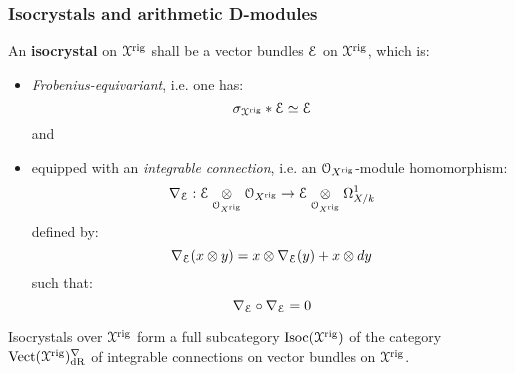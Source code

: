             \subsubsection{Isocrystals and arithmetic D-modules}
               \begin{definition}[Isocrystals] \label{def: isocrystals}
                    An \textbf{isocrystal} on $\mathcal{X}^{\mathrm{rig}}$ shall be a vector bundles $\mathcal{E}$ on $\mathcal{X}^{\mathrm{rig}}$, which is:
                        \begin{itemize}
                            \item \textit{Frobenius-equivariant}, i.e. one has:
                                $$\sigma_{\mathcal{X}^{\mathrm{rig}}}* \mathcal{E} \simeq \mathcal{E}$$
                            and
                            \item equipped with an \textit{integrable connection}, i.e. an $\mathcal{O}_{X^{\mathrm{rig}}}$-module homomorphism:
                                $$\nabla_{\E}: \E \tensor_{\calO_{X^{\rig}}} \calO_{X^{\rig}} \to \E \tensor_{\calO_{X^{\rig}}} \Omega^1_{X/k}$$
                            defined by:
                                $$\nabla_{\E}(x \tensor y) = x \tensor \nabla_{\E}(y) + x \tensor dy$$
                            such that:
                                $$\nabla_{\mathcal{E}} \circ \nabla_{\mathcal{E}} = 0$$
                        \end{itemize}
               \end{definition}
               \begin{proposition} \label{prop: categories_of_isocrystals}
                    Isocrystals over $\mathcal{X}^{\mathrm{rig}}$ form a full subcategory $\mathrm{Isoc}(\mathcal{X}^{\mathrm{rig}})$ of the category $\mathrm{Vect}(\mathcal{X}^{\mathrm{rig}})^{\nabla}_{\mathrm{dR}}$ of integrable connections on vector bundles on $\mathcal{X}^{\mathrm{rig}}$.
               \end{proposition}
